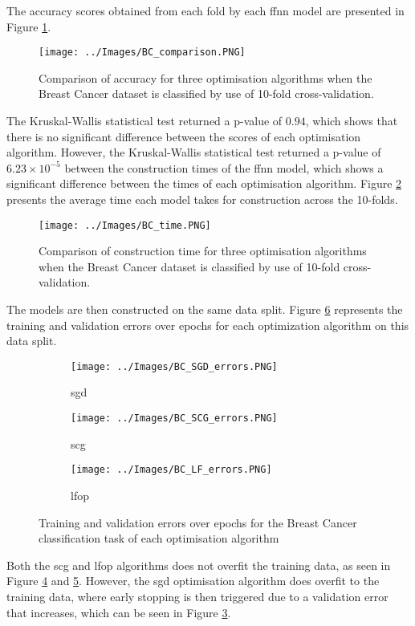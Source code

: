 \documentclass[10pt, conference]{IEEEtran}
\begin{document}
The accuracy scores obtained from each fold by each \acrshort{ffnn}
model are presented in Figure \ref{fig:BC_comparison}.
\begin{figure}[H]
    \centerline{\texttt{[image: ../Images/BC\_comparison.PNG]}}
    \caption{Comparison of accuracy for three optimisation algorithms when the Breast Cancer dataset is classified by use of 10-fold cross-validation.}
    \label{fig:BC_comparison}
\end{figure}
The Kruskal-Wallis statistical test returned a p-value of $0.94$, which shows that
there is no significant difference between the scores of each optimisation algorithm.
However, the Kruskal-Wallis statistical test returned a p-value of $6.23\times10^{-5}$
between the construction times of the \acrshort{ffnn} model, which shows a significant
difference between the times of each optimisation algorithm. Figure \ref{fig:BC_time}
presents the average time each model takes for construction across the 10-folds.
\begin{figure}[H]
    \centerline{\texttt{[image: ../Images/BC\_time.PNG]}}
    \caption{Comparison of construction time for three optimisation algorithms when the Breast Cancer dataset is classified by use of 10-fold cross-validation.}
    \label{fig:BC_time}
\end{figure}

The models are then constructed on the same data split. Figure \ref{fig:BC_errors} represents
the training and validation errors over epochs for each optimization algorithm on this data split.
\begin{figure}[H]
    \centering
    \begin{subfigure}[b]{0.23\textwidth}
        \centering
        \texttt{[image: ../Images/BC\_SGD\_errors.PNG]}
        \caption{\acrshort{sgd}}
        \label{fig:BC_SGD_errors}
    \end{subfigure}
    \hfill
    \begin{subfigure}[b]{0.23\textwidth}
        \centering
        \texttt{[image: ../Images/BC\_SCG\_errors.PNG]}
        \caption{\acrshort{scg}}
        \label{fig:BC_SCG_errors}
    \end{subfigure}
    \begin{subfigure}[b]{0.23\textwidth}
        \centering
        \texttt{[image: ../Images/BC\_LF\_errors.PNG]}
        \caption{\acrshort{lfop}}
        \label{fig:BC_LF_errors}
    \end{subfigure}
    \caption{Training and validation errors over epochs for the Breast Cancer classification task of each optimisation algorithm}
    \label{fig:BC_errors}
\end{figure}
Both the \acrshort{scg} and \acrshort{lfop} algorithms does not overfit the training data, as seen in Figure \ref{fig:BC_SCG_errors}
and \ref{fig:BC_LF_errors}. However, the \acrshort{sgd} optimisation algorithm does overfit to the training data, where early
stopping is then triggered due to a validation error that increases, which can be seen in Figure \ref{fig:BC_SGD_errors}.
\end{document}

